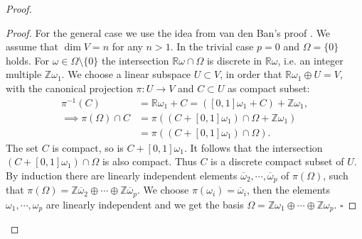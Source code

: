 \documentclass[envcountsect,runningheads]{llncs}
\renewcommand{\qed}{\hfill$\square$}
\begin{document}
\begin{proof}
\begin{proof}
For the general case we use the idea from van den Ban's proof \cite[p.27]{van2003lie}. We assume that $\dim V = n$ for any $n > 1$. In the trivial case $p = 0$ and $\Omega = \{0\}$ holds. For $\omega \in \Omega \setminus \{0\}$ the intersection $\mathbb{R} \omega \cap \Omega$ is discrete in $\mathbb{R} \omega$, i.e. an integer multiple $\mathbb{Z}\omega_1$. We choose a linear subspace $U \subset V$, in order that $\mathbb{R}\omega_1 \oplus U = V$, with the canonical projection $\pi: U \rightarrow V$ and $C \subset U$ as compact subset:
\begin{align}
\pi^{-1}\left(C\right) &= \mathbb{R} \omega_1 + C = \left([0,1] \omega_1 + C\right) + \mathbb{Z}\omega_1,\\
\implies \pi\left(\Omega\right) \cap C &= \pi\left(\left(C + [0,1] \omega_1\right) \cap \Omega + \mathbb{Z}\omega_1\right)\\
&= \pi\left(\left(C + [0,1]\omega_1\right) \cap \Omega\right). 
\end{align}
The set $C$ is compact, so is $C + [0,1] \omega_1$. It follows that the intersection $(C + [0,1] \omega_1) \cap \Omega$ is also compact. Thus $C$ is a discrete compact subset of $U$. By induction there are linearly independent elements $\overline{\omega}_2, \cdots, \overline{\omega}_p$ of $\pi(\Omega)$, such that $\pi(\Omega) = \mathbb{Z} \overline{\omega}_2 \oplus \cdots \oplus \mathbb{Z}\overline{\omega}_p$. We choose $\pi(\omega_i) = \overline{\omega}_i$, then the elements $\omega_1, \cdots, \omega_p$ are linearly independent and we get the basis $\Omega = \mathbb{Z}\omega_1 \oplus \cdots \oplus \mathbb{Z}\omega_p$. \qed
\end{proof}


\end{proof}
\end{document}

